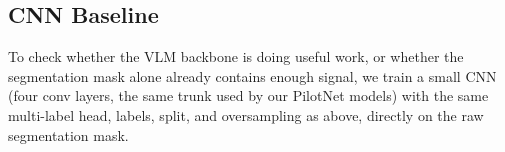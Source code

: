 \subsection{CNN Baseline}
\label{subsec:vlm_cnn_baseline}

To check whether the VLM backbone is doing useful work, or whether the segmentation mask alone already contains enough signal, we train a small CNN (four conv layers, the same trunk used by our PilotNet models) with the same multi-label head, labels, split, and oversampling as above, directly on the raw segmentation mask.
